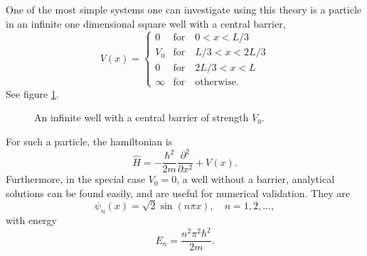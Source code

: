 \documentclass[a4paper, 11pt]{article}
\newcommand{\ddel}[2]{\frac{\partial^2 #1}{\partial #2^2}}
\begin{document}
One of the most simple systems one can investigate using this theory is a particle in an infinite one dimensional square well with a central barrier,
\begin{equation}
V(x) =
\begin{cases}
0 & \text{for} \quad 0 < x < L/3\\
V_0 & \text{for} \quad L/3 < x < 2L/3\\
0 & \text{for} \quad 2L/3 < x < L\\
\infty & \text{for} \quad \text{otherwise}.
\end{cases}
\end{equation}
See figure \ref{fig:potential}.
\begin{figure}[ht]
\centering
{}
\caption{An infinite well with a central barrier of strength $V_0$.\label{fig:potential}}
\end{figure}
For such a particle, the hamiltonian is \cite{assignment}
\begin{equation}\label{eq:hamil}
\hat{H} = -\frac{\hbar^2}{2m} \ddel{}{x} + V(x).
\end{equation}
Furthermore, in the special case $V_0=0$, a well without a barrier, analytical solutions can be found easily, and are useful for numerical validation.
They are\cite{griffith}
\begin{equation}\label{eq:anal}
\psi_n(x) = \sqrt{2} \sin\left(n\pi x\right), \quad n = 1, 2, \dots,
\end{equation}
with energy
\begin{equation}
E_n = \frac{n^2\pi^2 \hbar^2}{2m}.
\end{equation}
\end{document}

